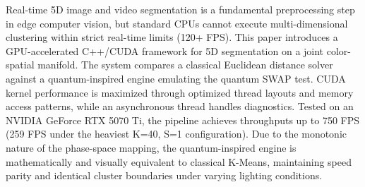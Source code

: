 Real-time 5D image and video segmentation is a fundamental preprocessing step in edge computer vision, but standard CPUs cannot execute multi-dimensional clustering within strict real-time limits (120+ FPS). This paper introduces a GPU-accelerated C++/CUDA framework for 5D segmentation on a joint color-spatial manifold. The system compares a classical Euclidean distance solver against a quantum-inspired engine emulating the quantum SWAP test. CUDA kernel performance is maximized through optimized thread layouts and memory access patterns, while an asynchronous thread handles diagnostics. Tested on an NVIDIA GeForce RTX 5070 Ti, the pipeline achieves throughputs up to 750 FPS (259 FPS under the heaviest K=40, S=1 configuration). Due to the monotonic nature of the phase-space mapping, the quantum-inspired engine is mathematically and visually equivalent to classical K-Means, maintaining speed parity and identical cluster boundaries under varying lighting conditions.

